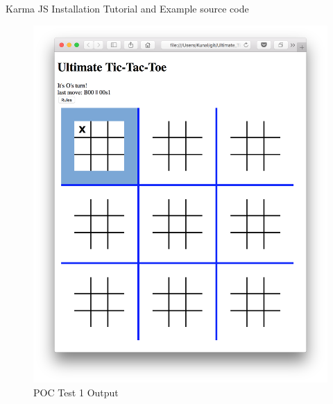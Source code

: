 \documentclass[12pt, titlepage]{article}
\begin{document}
Karma JS Installation Tutorial and Example source code~\citep{Karma}

\begin{figure}
  \includegraphics[width=\linewidth]{Figures/Test1-output.png}
  \caption{POC Test 1 Output}
  \label{fig:Test1_output}
\end{figure}
\end{document}
